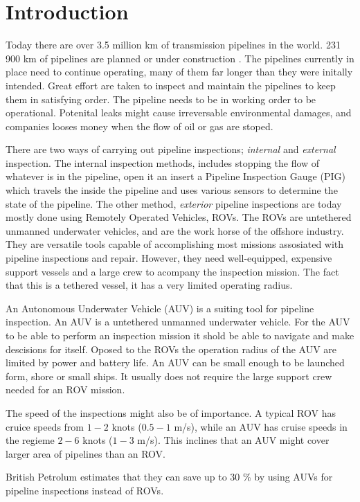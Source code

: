 \chapter{Introduction}
	Today there are over 3.5 million km of transmission pipelines in the world. 231 900 km of pipelines
	are planned or under construction \cite{DNV_pipelines}. The pipelines currently in place need to
	continue operating, many of them far longer than they were initally intended. Great effort are taken
	to inspect and maintain the pipelines to keep them in satisfying order.  The pipeline needs to be 
	in working order to be operational.
	Potenital leaks might cause irreversable environmental damages, and companies looses money when the flow
	of oil or gas are stoped. 

	There are two ways of carrying out pipeline inspections; \textit{internal} and \textit{external} 
	inspection. The internal inspection methods, includes stopping the flow of whatever is in the pipeline,
	open it an insert a Pipeline Inspection Gauge (PIG) which travels the inside the pipeline and uses various
	sensors to determine the state of the pipeline. The other method, \textit{exterior} pipeline
	inspections are today mostly done using Remotely Operated Vehicles, ROVs. The ROVs are untethered
	unmanned underwater vehicles, and are the work horse of the offshore industry. They are versatile
	tools capable of accomplishing most missions assosiated with pipeline inspections and repair. However,
	they need well-equipped, expensive support vessels and a large crew to acompany the inspection
	mission. The fact that this is a tethered vessel, it has a very limited operating radius. 

	An Autonomous Underwater Vehicle (AUV) is a suiting tool for pipeline inspection. An AUV is a
	untethered unmanned underwater vehicle. For the AUV to be able to perform an inspection mission it
	shold be able to navigate and make descisions for itself. Oposed to the ROVs the operation radius of
	the AUV are limited by power and battery life. An AUV can be small enough to be launched form, shore
	or small ships. It usually does not require the large support crew needed for an ROV mission.

	The speed of the inspections might also be of importance. A typical ROV has cruice speeds from $1-2$
	knots ($0.5-1$ m/s), while an AUV has cruise speeds in the regieme $2-6$ knots ($1-3$ m/s). This
	inclines that an AUV might cover larger area of pipelines than an ROV. 

	British Petrolum estimates that they can save up to 30 \% by using AUVs for pipeline inspections
	instead of ROVs.\cite{PhD_lecture}

